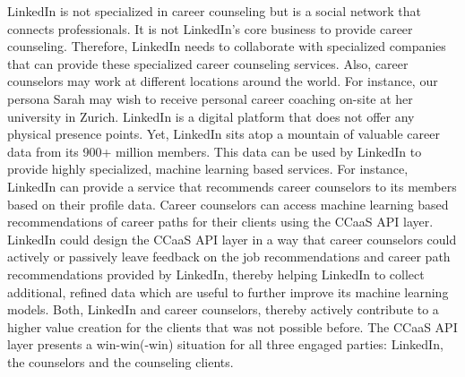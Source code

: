 LinkedIn is not specialized in career counseling but is a social network that connects professionals. It is not
LinkedIn's core business to provide career counseling. Therefore, LinkedIn needs to collaborate with specialized
companies that can provide these specialized career counseling services. Also, career counselors may work at different
locations around the world. For instance, our persona Sarah may wish to receive personal career coaching on-site at
her university in Zurich. LinkedIn is a digital platform that does not offer any physical presence points. Yet, LinkedIn
sits atop a mountain of valuable career data from its 900+ million members. This data can be used by LinkedIn to provide
highly specialized, machine learning based services. For instance, LinkedIn can provide a service that recommends career
counselors to its members based on their profile data. Career counselors can access machine learning based recommendations
of career paths for their clients using the CCaaS API layer. LinkedIn could design the CCaaS API layer in a way that career
counselors could actively or passively leave feedback on the job recommendations and career path recommendations provided
by LinkedIn, thereby helping LinkedIn to collect additional, refined data which are useful to further improve its machine
learning models. Both, LinkedIn and career counselors, thereby actively contribute to a higher value creation for the
clients that was not possible before. The CCaaS API layer presents a win-win(-win) situation for all three engaged parties:
LinkedIn, the counselors and the counseling clients.